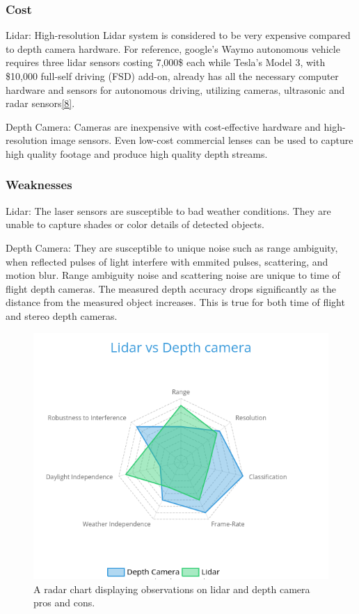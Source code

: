 \documentclass{article}
\begin{document}
\subsubsection{Cost}

Lidar: High-resolution Lidar system is considered to be very expensive compared to depth camera hardware. For reference, google's Waymo autonomous vehicle requires three lidar sensors costing 7,000\$ each while Tesla’s Model 3, with \$10,000 full-self driving (FSD) add-on, already has all the necessary computer hardware and sensors for autonomous driving, utilizing cameras, ultrasonic and radar sensors\href{https://www.voltequity.com/article/why-lidar-is-doomed}{[8]}.

Depth Camera: Cameras are inexpensive with cost-effective hardware and high-resolution image sensors. Even low-cost commercial lenses can be used to capture high quality footage and produce high quality depth streams.
 
\subsubsection{Weaknesses}

Lidar: The laser sensors are susceptible to bad weather conditions. They are unable to capture shades or color details of detected objects.

Depth Camera: They are susceptible to unique noise such as range ambiguity, when reflected pulses of light interfere with emmited pulses, scattering, and motion blur. Range ambiguity noise and scattering noise are unique to time of flight depth cameras. The measured depth accuracy drops significantly as the distance from the measured object increases. This is true for both time of flight and stereo depth cameras. 

\begin{figure}[h] %
	\centering
	\includegraphics[width=1\columnwidth]{report1-img023.png} %
	\caption{A radar chart displaying observations on lidar and depth camera pros and cons.}
\end{figure}
\end{document}
